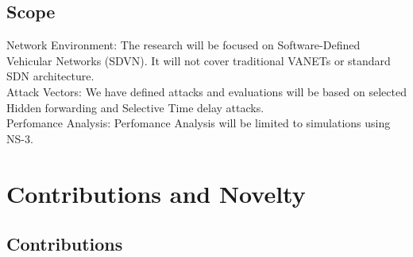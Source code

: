 \documentclass[12pt, a4paper]{report}
\begin{document}
\vspace{0.5\baselineskip}

\subsection{Scope}

\noindent Network Environment: The research will be focused on Software-Defined Vehicular Networks (SDVN). It will not cover traditional VANETs or standard SDN architecture.\\[\baselineskip]
\noindent Attack Vectors: We have defined attacks and evaluations will be based on selected Hidden forwarding and Selective Time delay attacks.\\[\baselineskip]
\noindent Perfomance Analysis: Perfomance Analysis will be limited to simulations using NS-3.


\section{Contributions and Novelty}


\subsection{Contributions}
\label{sec:contributions}
\end{document}
